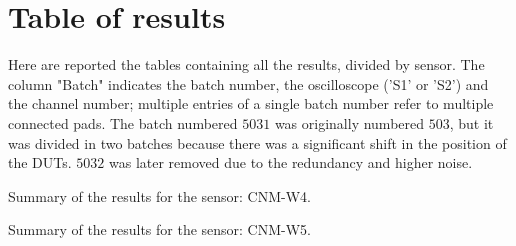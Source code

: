 
\FloatBarrier

\section{Table of results}

Here are reported the tables containing all the results, divided by sensor. The column "Batch" indicates the batch number, the oscilloscope ('S1' or 'S2') and the channel number; multiple entries of a single batch number refer to multiple connected pads. The batch numbered \(5031\) was originally numbered \(503\), but it was divided in two batches because there was a significant shift in the position of the DUTs. \(5032\) was later removed due to the redundancy and higher noise.

\begin{table}[htbp]
    \scriptsize
    \centering
    \caption{Summary of the results for the sensor: CNM-W4.}
    \label{tab:results_CNM-W4}
    
\end{table}

\begin{table}[htbp]
    \scriptsize
    \centering
    \caption{Summary of the results for the sensor: CNM-W5.}
    \label{tab:results_CNM-W5}
    
\end{table}

